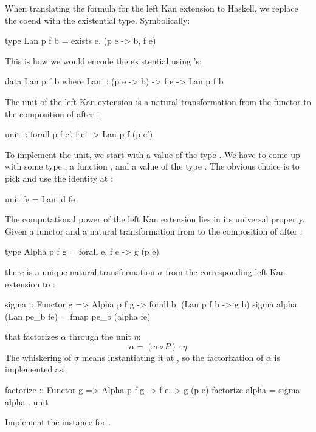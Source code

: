 \documentclass[DaoFP]{subfiles}
\begin{document}
When translating the formula for the left Kan extension to Haskell, we replace the coend with the existential type. Symbolically:
 \begin{haskell}
type Lan p f b = exists e. (p e -> b, f e)
 \end{haskell}
This is how we would encode the existential using 's:
 \begin{haskell}
data Lan p f b where
    Lan :: (p e -> b) -> f e -> Lan p f b
 \end{haskell}
 
 The unit of the left Kan extension is a natural transformation from the functor  to the composition of  after :
 \begin{haskell}
unit :: forall p f e'. 
    f e' -> Lan p f (p e')
\end{haskell}
To implement the unit, we start with a value of the type . We have to come up with some type , a function , and a value of the type . The obvious choice is to pick  and use the identity at :
\begin{haskell}
unit fe = Lan id fe 
\end{haskell}

The computational power of the left Kan extension lies in its universal property. Given a functor  and a natural transformation from  to the composition of  after :
\begin{haskell}
type Alpha p f g = forall e. f e -> g (p e)
\end{haskell}
there is a unique natural transformation $\sigma$ from the corresponding left Kan extension to :
\begin{haskell}
sigma :: Functor g => Alpha p f g -> forall b. (Lan p f b -> g b)
sigma alpha (Lan pe_b fe) = fmap pe_b (alpha fe)
\end{haskell}
that factorizes $\alpha$ through the unit $\eta$:
\[ \alpha = (\sigma \circ P) \cdot \eta \]
The whiskering of $\sigma$ means instantiating it at , so the factorization of $\alpha$ is implemented as:
\begin{haskell}
factorize :: Functor g => Alpha p f g -> f e -> g (p e)
factorize alpha = sigma alpha . unit
\end{haskell}
 \begin{exercise}
Implement the  instance for .
\end{exercise}
\end{document}
